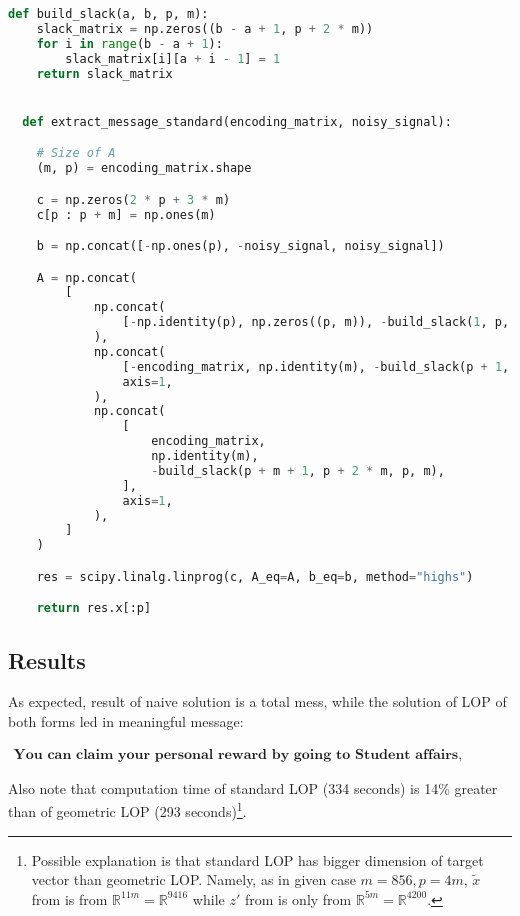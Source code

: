 \documentclass{article}
\def\R{\mathbb{R}}
\def\xt{\tilde{x}}
\begin{document}
\begin{minipage}{\linewidth}
  \begin{lstlisting}[language=Python, caption={Message decryption based on solution of LOP in standard form}, label={lst:std}]
  def build_slack(a, b, p, m):
    slack_matrix = np.zeros((b - a + 1, p + 2 * m))
    for i in range(b - a + 1):
        slack_matrix[i][a + i - 1] = 1
    return slack_matrix


  def extract_message_standard(encoding_matrix, noisy_signal):

    # Size of A
    (m, p) = encoding_matrix.shape

    c = np.zeros(2 * p + 3 * m)
    c[p : p + m] = np.ones(m)

    b = np.concat([-np.ones(p), -noisy_signal, noisy_signal])

    A = np.concat(
        [
            np.concat(
                [-np.identity(p), np.zeros((p, m)), -build_slack(1, p, p, m)], axis=1
            ),
            np.concat(
                [-encoding_matrix, np.identity(m), -build_slack(p + 1, p + m, p, m)],
                axis=1,
            ),
            np.concat(
                [
                    encoding_matrix,
                    np.identity(m),
                    -build_slack(p + m + 1, p + 2 * m, p, m),
                ],
                axis=1,
            ),
        ]
    )

    res = scipy.linalg.linprog(c, A_eq=A, b_eq=b, method="highs")

    return res.x[:p]
\end{lstlisting}
\end{minipage}

\subsection{Results}
As expected, result of naive solution is a total mess, while the solution of LOP of both forms led in meaningful message:

\begin{equation*}
  \begin{aligned}
    \textbf{You can claim your personal reward by going to Student affairs, giving you code=1083 and ask for you reward}
  \end{aligned}
\end{equation*}

Also note that computation time of standard LOP (334 seconds) is 14\% greater than of geometric LOP (293 seconds)\footnote{Possible explanation is that standard LOP has bigger dimension of target vector than geometric LOP. Namely, as in given case $m=856, p=4m$, $\xt$ from  is from $\R^{11m} = \R^{9416}$ while $z'$ from  is only from $\R^{5m} = \R^{4200}$.
}.
\end{document}

